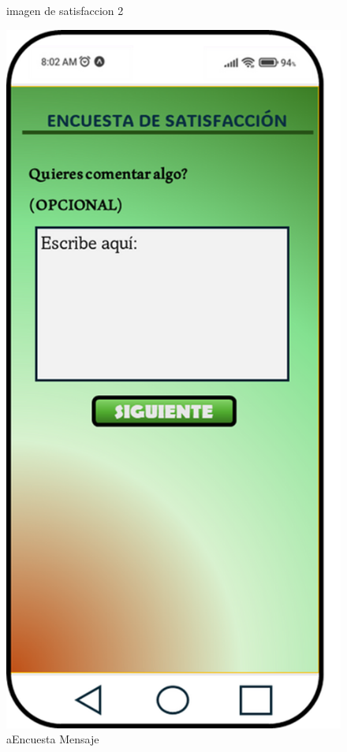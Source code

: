 \documentclass[11pt, a4paper, oneside]{book}
\begin{document}
\begin{figure}[H]
\begin{minipage}{0.3\textwidth}
        \caption{imagen de satisfaccion 2}
    \end{minipage}
    \hfill
    \begin{minipage}{0.3\textwidth}
        \centering
        \includegraphics[width=\textwidth]{Pictures/Imagen 3.png}
        \caption{aEncuesta Mensaje}
    \end{minipage}
\end{figure}
\end{document}
